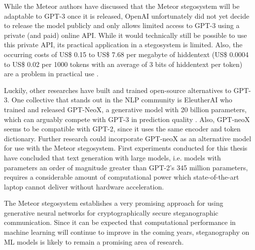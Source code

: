 While the Meteor authors have discussed that the Meteor stegosystem will be adaptable to GPT-3 once it is released, OpenAI unfortunately did not yet decide to release the model publicly and only allows limited access to GPT-3 using a private (and paid) online API.
While it would technically still be possible to use this private API, its practical application in a stegosystem is limited.
Also, the occurring costs of US\$ 0.15 to US\$ 7.68 per megabyte of hiddentext (US\$ 0.0004 to US\$ 0.02 per 1000 tokens with an average of 3 bits of hiddentext per token) are a problem in practical use \cite{OpenAIPricing2022}.

Luckily, other researches have built and trained open-source alternatives to GPT-3.
One collective that stands out in the NLP community is EleutherAI who trained and released GPT-NeoX, a generative model with 20 billion parameters, which can arguably compete with GPT-3 in prediction quality \cite{GPTneo2022}.
Also, GPT-neoX seems to be compatible with GPT-2, since it uses the same encoder and token dictionary.
Further research could incorporate GPT-neoX as an alternative model for use with the Meteor stegosystem.
First experiments conducted for this thesis have concluded that text generation with large models, i.e. models with parameters an order of magnitude greater than GPT-2's 345 million parameters, requires a considerable amount of computational power which state-of-the-art laptop cannot deliver without hardware acceleration.

The Meteor stegosystem establishes a very promising approach for using generative neural networks for cryptographically secure steganographic communication.
Since it can be expected that computational performance in machine learning will continue to improve in the coming years, steganography on ML models is likely to remain a promising area of research.